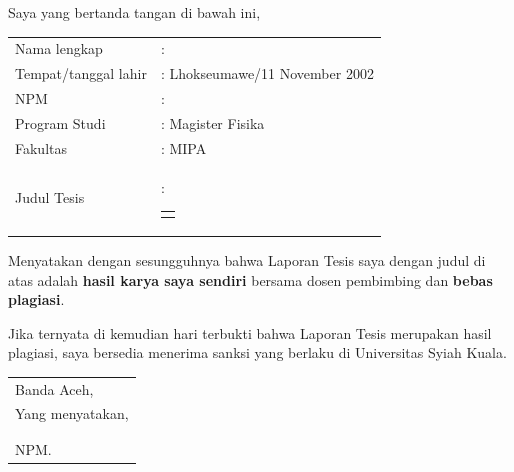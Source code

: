 \pagestyle{preliminarypage}
\makeatletter
{}

\onehalfspacing
\noindent
Saya yang bertanda tangan di bawah ini,

\vspace{0.2cm}
\noindent
\begin{center}
	\begin{tabularx}{0.9\textwidth}{@{} l X @{}} %
		Nama lengkap          & : \@fullname \\
		Tempat/tanggal lahir  & : Lhokseumawe/11 November 2002 \\
		NPM                   & : \@idnum \\
		Program Studi         & : Magister Fisika \\
		Fakultas              & : MIPA \\
		Judul Tesis     & : 
		\begin{tabular}[t]{@{}p{\linewidth}@{}}
			\@judul
		\end{tabular} \\
	\end{tabularx}
\end{center}



\vspace{0.2cm}
\noindent
Menyatakan dengan sesungguhnya bahwa Laporan Tesis saya dengan judul di atas adalah \textbf{hasil karya saya sendiri} bersama dosen pembimbing dan \textbf{bebas plagiasi}.

\vspace{0.2cm}
\noindent
Jika ternyata di kemudian hari terbukti bahwa Laporan Tesis merupakan hasil plagiasi, saya bersedia menerima sanksi yang berlaku di Universitas Syiah Kuala.

\vspace{1cm}
\begin{onehalfspace}
	\begin{flushright} %
		\begin{tabular}{l@{}}
			Banda Aceh, \@tanggalhari\space\@tanggalbulan\space\@tanggaltahun\\[-0.15cm]
			Yang menyatakan, \\
			\\[1.5cm] %
			\underline{\@fullname} \\[-0.15cm]
			NPM. \@idnum \\
		\end{tabular}
	\end{flushright}
\end{onehalfspace}

\makeatother

